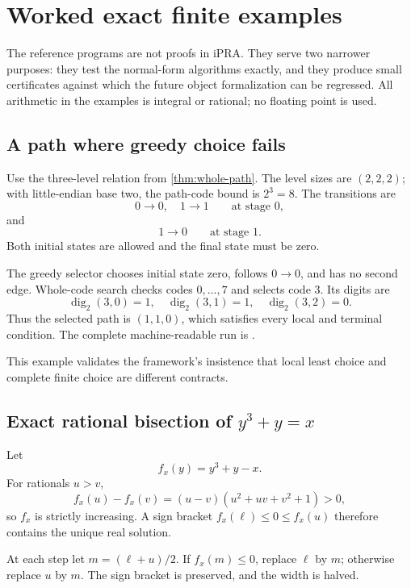 \section{Worked exact finite examples}\label{sec:examples}

The reference programs are not proofs in iPRA.  They serve two narrower
purposes: they test the normal-form algorithms exactly, and they produce small
certificates against which the future object formalization can be regressed.
All arithmetic in the examples is integral or rational; no floating point is
used.

\subsection{A path where greedy choice fails}

Use the three-level relation from \cref{thm:whole-path}.  The level sizes are
\((2,2,2)\); with little-endian base two, the path-code bound is \(2^3=8\).
The transitions are
\[
  0\to0,\quad 1\to1
  \qquad\text{at stage }0,
\]
and
\[
  1\to0
  \qquad\text{at stage }1.
\]
Both initial states are allowed and the final state must be zero.

The greedy selector chooses initial state zero, follows \(0\to0\), and has no
second edge.  Whole-code search checks codes \(0,\ldots,7\) and selects code
\(3\).  Its digits are
\[
  \operatorname{dig}_2(3,0)=1,
  \quad
  \operatorname{dig}_2(3,1)=1,
  \quad
  \operatorname{dig}_2(3,2)=0.
\]
Thus the selected path is \((1,1,0)\), which satisfies every local and terminal
condition.  The complete machine-readable run is
.

This example validates the framework's insistence that local least choice and
complete finite choice are different contracts.

\subsection{Exact rational bisection of \texorpdfstring{\(y^3+y=x\)}{y^3+y=x}}

Let
\[
  f_x(y)=y^3+y-x.
\]
For rationals \(u>v\),
\[
 f_x(u)-f_x(v)
 =(u-v)(u^2+uv+v^2+1)>0,
\]
so \(f_x\) is strictly increasing.  A sign bracket
\(f_x(\ell)\le0\le f_x(u)\) therefore contains the unique real solution.

At each step let \(m=(\ell+u)/2\).  If \(f_x(m)\le0\), replace \(\ell\) by
\(m\); otherwise replace \(u\) by \(m\).  The sign bracket is preserved, and
the width is halved.

